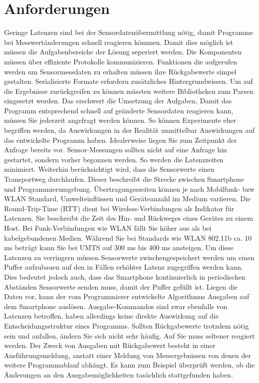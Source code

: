\documentclass[11pt,a4paper]{report}
\begin{document}
\section{Anforderungen}\label{sec:anforderungen}
Geringe Latenzen sind bei der Sensordatenübermittlung nötig, damit Programme bei Messwertänderungen schnell reagieren könnnen.
Damit dies möglich ist müssen die Aufgabenbereiche der Lösung seperiert werden.
Die Komponenten müssen über effiziente Protokolle kommunizieren.
Funktionen die aufgerufen werden um Sensormessdaten zu erhalten müssen ihre Rückgabewerte simpel gestalten.
Serialisierte Formate erfordern zusätzliches Hintergrundwissen.
Um auf die Ergebnisse zurückgreifen zu können müssten weitere Bibliotheken zum Parsen eingesetzt werden.
Das erschwert die Umsetzung der Aufgaben.
Damit das Programm entsprechend schnell auf geänderte Sensordaten reagieren kann, müssen Sie jederzeit angefragt werden können.
So können Experimente eher begriffen werden, da Auswirkungen in der Realität unmittelbar Auswirkungen auf das entwickelte Programm haben.
Idealerweise liegen Sie zum Zeitpunkt der Anfrage bereits vor.
Sensor-Messungen sollten nicht auf eine Anfrage hin gestartet, sondern vorher begonnen werden.
So werden die Latenzzeiten minimiert.
Weiterhin berücksichtigt wird, dass die Sensorwerte einen Transportweg durchlaufen.
Dieser beschreibt die Strecke zwischen Smartphone und Programmierumgebung.
Übertragungsszeiten können je nach Mobilfunk- bzw WLAN Standard, Umwelteinflüssen und Geräteanzahl im Medium variieren.
Die Round-Trip-Time (RTT) dient bei Wireless-Verbindungen als Indikator für Latenzen.
Sie beschreibt die Zeit des Hin- und Rückweges eines Gerätes zu einem Host.
Bei Funk-Verbindungen wie WLAN fällt Sie höher aus als bei kabelgebundenen Medien.
Während Sie bei Standards wie WLAN 802.11b ca. 10 ms beträgt kann Sie bei UMTS auf 300 ms bis 400 ms ansteigen.\cite{network_latencies}
Um diese Latenzen zu verringern müssen Sensorwerte zwischengespeichert werden um einen Puffer aufzubauen auf den in Fällen erhöhter Latenz zugegriffen werden kann.
Dies bedeutet jedoch auch, dass das Smartphone kontinuierlich in periodischen Abständen Sensorwerte senden muss, damit der Puffer gefüllt ist.
Liegen die Daten vor, kann der vom Programmierer entwickelte Algorithmus Ausgaben auf dem Smartphone auslösen.
Ausgabe-Kommandos sind zwar ebenfalls von Latenzen betroffen, haben allerdings keine direkte Auswirkung auf die Entscheidungsstruktur eines Programms.
Sollten Rückgabewerte trotzdem nötig sein und anfallen, ändern Sie sich nicht sehr häufig.
Auf Sie muss seltener reagiert werden.
Der Zweck von Ausgaben mit Rückgabewert besteht in einer Ausführungsmeldung, anstatt einer Meldung von Messergebnissen von denen der weitere Programmablauf abhängt.
Es kann zum Beispiel überprüft werden, ob die Änderungen an den Ausgabemöglichkeiten tasächlich stattgefunden haben.
\end{document}
